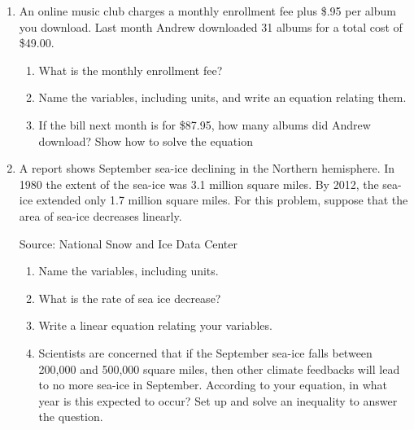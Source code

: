 \begin{enumerate}
\newpage

\item An online music club charges a monthly enrollment fee plus \$.95 per album you download.  Last month Andrew downloaded 31 albums for a total cost of \$49.00.  
\begin{enumerate}
\item What is the monthly enrollment fee?  
\vfill
\item Name the variables, including units, and write an equation relating them. 
\vfill
\item If the bill next month is for \$87.95, how many albums did Andrew download? Show how to solve the equation
\vfill
\end{enumerate} 

\newpage

\item A report  shows September sea-ice declining in the Northern hemisphere. In 1980 the extent of the sea-ice was 3.1 million square miles.  By 2012, the sea-ice extended only 1.7 million square miles.  For this problem, suppose that the area of sea-ice decreases linearly. 
\hfill \begin{footnotesize} Source: National Snow and Ice Data Center \end{footnotesize}
\begin{enumerate}
\item Name the variables, including units. 
\vfill
\item What is the rate of sea ice decrease? 
\vfill
\item Write a linear equation relating your variables. 
\vfill
\item Scientists are concerned that if the September sea-ice falls between 200,000 and 500,000 square miles, then other climate feedbacks will lead to no more sea-ice in September.  According to your equation, in what year is this expected to occur?  Set up and solve an inequality to answer the question. 
\vfill
\end{enumerate} 

\newpage


\end{enumerate}
